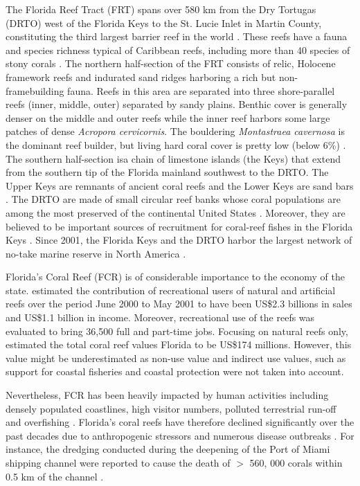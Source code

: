 \documentclass[12pt ,a4paper]{article}
\begin{document}
The Florida Reef Tract (FRT) spans over 580 km from the Dry Tortugas (DRTO) west of the Florida Keys to the St. Lucie Inlet in Martin County, constituting the third largest barrier reef in the world \citep{finkl2008shelf}. These reefs have a fauna and species richness typical of Caribbean reefs, including more than 40 species of stony corals \citep{banks2008reef,jackson2014status}. The northern half-section of the FRT consists of relic, Holocene framework reefs and indurated sand ridges harboring a rich but non-framebuilding fauna. Reefs in this area are separated into three shore-parallel reefs (inner, middle, outer) separated by sandy plains. Benthic cover is generally denser on the middle and outer reefs while the inner reef harbors some large patches of dense \textit{Acropora cervicornis}. The bouldering \textit{Montastraea cavernosa} is the dominant reef builder, but living hard coral cover is pretty low (below 6\%) \citep{banks2008reef}. The southern half-section isa chain of limestone islands (the Keys) that extend from the southern tip of the Florida mainland southwest to the DRTO. The Upper Keys are remnants of ancient coral reefs and the Lower Keys are sand bars \citep{hoffmeister1968geology}. The DRTO are made of small circular reef banks whose coral populations are among the most preserved of the continental United States \citep{hine2008coral, kourafalou2018physical}. Moreover, they are believed to be important sources of recruitment for coral-reef fishes in the Florida Keys \citep{domeier2004potential}. Since 2001, the Florida Keys and the DRTO harbor the largest network of no-take marine reserve in North America \citep{ault2006building}.

Florida's Coral Reef (FCR) is of considerable importance to the economy of the state. \cite{johns2003socio} estimated the contribution of recreational users of natural and artificial reefs over the period June 2000 to May 2001 to have been US\$2.3 billions in sales and US\$1.1 billion in income. Moreover, recreational use of the reefs was evaluated to bring 36,500 full and part-time jobs. Focusing on natural reefs only, \cite{brander2013total} estimated the total coral reef values Florida to be US\$174 millions. However, this value might be underestimated as non-use value and indirect use values, such as support for coastal fisheries \citep{ault2006building} and coastal protection \citep{ferrario2014effectiveness} were not taken into account.

Nevertheless, FCR has been heavily impacted by human activities including densely populated coastlines, high visitor numbers, polluted terrestrial run-off and overfishing \citep{jackson2014status}. Florida's coral reefs have therefore declined significantly over the past decades due to anthropogenic stressors and numerous disease outbreaks \citep{gardner2003long, jackson2014status}. For instance, the dredging conducted during the deepening of the Port of Miami shipping channel were reported to cause the death of $>$ 560, 000 corals within 0.5 km of the channel \citep{cunning2019extensive}.
\end{document}
